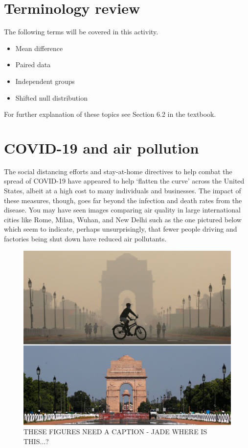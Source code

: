 \documentclass[
]{report}
\begin{document}
\hypertarget{terminology-review}{%
\section{Terminology review}\label{terminology-review}}

The following terms will be covered in this activity.

\begin{itemize}
\item
  Mean difference
\item
  Paired data
\item
  Independent groups
\item
  Shifted null distribution
\end{itemize}

For further explanation of these topics see Section 6.2 in the textbook.

\hypertarget{covid-19-and-air-pollution-1}{%
\section{COVID-19 and air pollution}\label{covid-19-and-air-pollution-1}}

The social distancing efforts and stay-at-home directives to help combat the spread of COVID-19 have appeared to help `flatten the curve' across the United States, albeit at a high cost to many individuals and businesses. The impact of these measures, though, goes far beyond the infection and death rates from the disease. You may have seen images comparing air quality in large international cities like Rome, Milan, Wuhan, and New Delhi such as the one pictured below which seem to indicate, perhaps unsurprisingly, that fewer people driving and factories being shut down have reduced air pollutants.

\begin{figure}

{\centering \includegraphics[width=0.6\linewidth]{images/air_pollution} 

}

\caption{THESE FIGURES NEED A CAPTION - JADE WHERE IS THIS...?}\label{fig:unnamed-chunk-1}
\end{figure}
\end{document}
